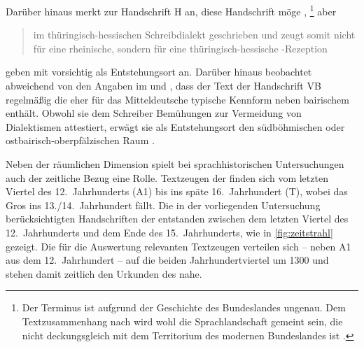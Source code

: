 Darüber hinaus merkt \citet{klein1988} zur Handschrift H an, diese
Handschrift möge ,%
%
	\footnote{Der Terminus  ist aufgrund der Geschichte des
	Bundeslandes ungenau. Dem Textzusammenhang nach wird wohl die
	Sprachlandschaft gemeint sein, die nicht deckungsgleich mit dem Territorium
	des modernen Bundeslandes ist \autocite[vgl.~z.\,B.][853]{wiesinger1983}.}
%
aber \blockcquote[118]{klein1988}{im thüringisch-hessischen Schreibdialekt
geschrieben und zeugt somit nicht für eine rheinische, sondern für eine
thüringisch-hessische \nocite{schroeder1895}-Rezeption}.
\textcites{kcdigital}[23]{wolf:kckat} geben mit
\citet[237--238]{millerzimmermann2007} vorsichtig  als
Entstehungsort an.
%
\label{phsec:vbherkunft}%
Darüber hinaus beobachtet \citeauthor{schneider1987} abweichend von den
Angaben im  und \citet{kcdigital}, dass der Text der Handschrift
VB regelmäßig die eher für das Mitteldeutsche typische Kennform
  neben bairischem  enthält. Obwohl sie dem
Schreiber Bemühungen zur Vermeidung von Dialektismen attestiert, erwägt sie als
Entstehungsort den südböhmischen oder ostbairisch-oberpfälzischen Raum
\autocite[226]{schneider1987}.

Neben der räumlichen Dimension spielt bei sprachhistorischen Untersuchungen
auch der zeitliche Bezug eine Rolle. Textzeugen der \KC{} finden sich vom
letzten Viertel des 12.~Jahrhunderts (A1) bis ins späte
16.~Jahrhundert (T), wobei das Gros ins 13./14.~Jahrhundert fällt.
Die in der vorliegenden Untersuchung berücksichtigten Handschriften der
\KC{} entstanden zwischen dem letzten Viertel des 12.~Jahrhunderts und dem
Ende des 15.~Jahrhunderts, wie in \cref{fig:zeitstrahl} gezeigt. Die für die
Auswertung relevanten Textzeugen verteilen sich -- neben A1 aus dem
12.~Jahrhundert -- auf die beiden Jahrhundertviertel um 1300 und stehen damit
zeitlich den Urkunden des \CAO{} nahe.

